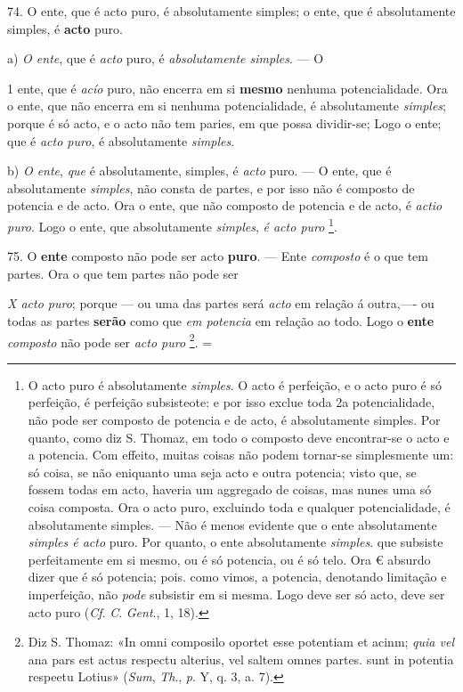 74. O ente, que é acto puro, é absolutamente simples; o ente, que é absolutamente simples, é \textbf{acto} puro.

a) \emph{O ente}, que é \emph{acto} puro, é \emph{absolutamente simples}. --- O

1   ente, que é \emph{acío} puro, não encerra em si \textbf{mesmo} nenhuma potencialidade. Ora o ente, que não encerra em si nenhuma potencialidade, é absolutamente \emph{simples}; porque é só acto, e o acto não tem paries, em que possa dividir-se; Logo o ente; que é \emph{acto puro}, é absolutamente \emph{simples}.

b) \emph{O ente}, \emph{que} é absolutamente, simples, é \emph{acto} puro. --- O ente, que é absolutamente \emph{simples}, não consta de partes, e por isso não é composto de potencia e de acto. Ora o ente, que não composto de potencia e de acto, é \emph{actio puro}. Logo o ente, que absolutamente \emph{simples}, \emph{é acto puro} \footnote{O acto puro é absolutamente \emph{simples}. O acto é perfeição, e o acto puro é só perfeição, é perfeição subsisteote: e por isso exclue toda 2a potencialidade, não pode ser composto de potencia e de acto, é absolutamente \textbar{} simples. Por quanto, como diz S. Thomaz, em todo o composto deve encontrar-se o acto e a potencia. Com effeito, muitas coisas não podem tornar-se simplesmente um: só coisa, se não eniquanto uma seja acto e outra potencia; visto que, se fossem todas em acto, haveria um aggregado de coisas, mas nunes uma só coisa composta. Ora o acto puro, excluindo toda e qualquer potencialidade, é absolutamente simples. --- Não é menos evidente que o ente absolutamente \emph{simples é acto} puro. Por quanto, o ente absolutamente \emph{simples}. que subsiste perfeitamente em si mesmo, ou é só potencia, ou é só telo. Ora € absurdo dizer que é só potencia; pois. como vimos, a potencia, denotando limitação e imperfeição, não \emph{pode} subsistir em si mesma. Logo deve ser só acto, deve ser acto puro (\emph{Cf}. \emph{C}. \emph{Gent}., 1, 18).}.

75. O \textbf{ente} composto não pode ser acto \textbf{puro}. --- Ente \emph{composto} é o que tem partes. Ora o que tem partes não pode ser

\emph{X acto puro}; porque --- ou uma das partes será \emph{acto} em relação á outra,---- ou todas as partes \textbf{serão} como que \emph{em potencia} em relação ao todo. Logo o \textbf{ente} \emph{composto} não pode ser \emph{acto puro} \footnote{Diz S. Thomaz: «In omni composilo oportet esse potentiam et acinm; \emph{quia vel} ana pars est actus respectu alterius, vel saltem omnes partes. sunt in potentia respeetu Lotius» (\emph{Sum}, \emph{Th}., \emph{p}. Y, q. 3, a. 7).}. =

